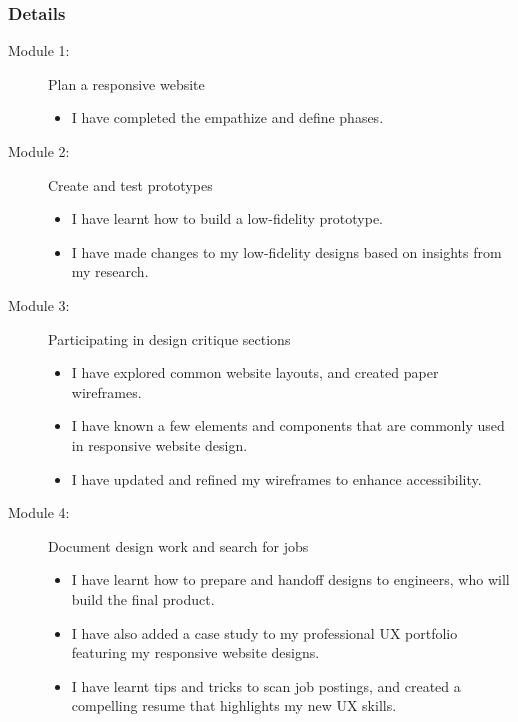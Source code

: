 \subsubsection{Details}
\begin{flushleft}
	\begin{description}
		\item[Module 1:] Plan a responsive website
		      \begin{itemize}
			      \item I have completed the empathize and define phases.
		      \end{itemize}
		\item[Module 2:] Create and test prototypes
		      \begin{itemize}
			      \item I have learnt how to build a low-fidelity prototype.
			      \item I have made changes to my low-fidelity designs based on insights from my research.
		      \end{itemize}
		\item[Module 3:] Participating in design critique sections
		      \begin{itemize}
			      \item I have explored common website layouts, and created paper wireframes.
			      \item I have known a few elements and components that are commonly used in responsive website design.
			      \item I have updated and refined my wireframes to enhance accessibility.
		      \end{itemize}
		\item[Module 4:] Document design work and search for jobs
		      \begin{itemize}
			      \item I have learnt how to prepare and handoff designs to engineers, who will build the final product.
			      \item I have also added a case study to my professional UX portfolio featuring my responsive website designs.
			      \item I have learnt tips and tricks to scan job postings, and created a compelling resume that highlights my new UX skills.
		      \end{itemize}
	\end{description}
\end{flushleft}